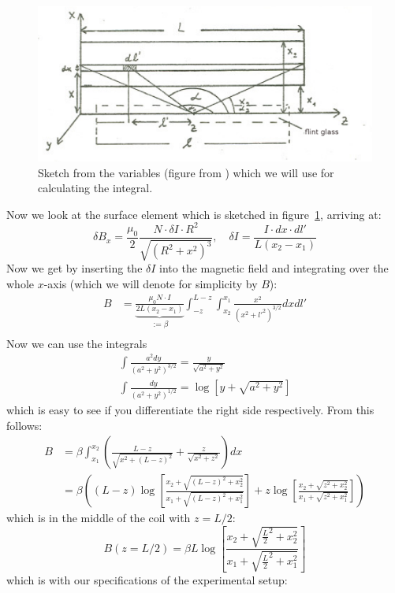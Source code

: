 \begin{figure}
    \begin{centering}
        \includegraphics[width=14cm]{figures/integral}
\caption{Sketch from the variables (figure from \cite{staatsexamen}) which we will use
            for calculating the integral. 
            }
        \label{fig:integral}
    \end{centering}
\end{figure}
Now we look at the surface element which is sketched in figure~\ref{fig:integral},
arriving at:
\begin{equation}
 \delta B_x =  \frac{\mu_0}{2} \frac{N \cdot \delta I  \cdot R^2}{\sqrt{\left (R^2 + x^2 \right )^3}} ,
 \quad \delta I = \frac{ I \cdot dx \cdot dl'}{L(x_2 - x_1)}
\end{equation}
Now we get by inserting the $\delta I$ into the magnetic field and integrating over
the whole $x$-axis (which we will denote for simplicity by $B$):
\begin{align}
    B &= \underbrace{ \frac{\mu_0 N\cdot I}{2 L (x_2 - x_1)} }_{:=\beta}
    \int^{L-z}_{-z} \int^{x_1}_{x_2} \frac{x^2}{(x^2 + l'^2)^{3/2}} dx dl'\\
\end{align}
Now we can use the integrals
\begin{align}
    \int \frac{a^2 dy}{(a^2 + y^2)^{3/2}} =  \frac{y}{\sqrt{a^2 + y^2}} \\
    \int \frac{dy}{(a^2 + y^2)^{1/2}} =  \log{\left [ y + \sqrt{a^2 + y^2} \right]}
\end{align}
which is easy to see if you differentiate the right side respectively. From this follows:
\begin{align}
    B &= \beta \int^{x_2}_{x_1} \left (  \frac{L - z}{\sqrt{x^2 + (L-z)^2}} +
      \frac{z}{\sqrt{x^2 + z^2}}    \right ) dx  \\
  &= \beta  \left (
  (L-z) \log{\left [ \frac{x_2 + \sqrt{(L-z)^2 + x_2^2}} { x_1 + \sqrt{(L-z)^2 + x_1^2}} \right]}
  +z \log{\left [ \frac{x_2 + \sqrt{z^2 + x_2^2}} { x_1 + \sqrt{z^2 + x_1^2}} \right]}
  \right)
\end{align}
which is in the middle of the coil with $z = L/2$:
\begin{equation}
    B(z = L/2) = \beta 
    L \log{\left [ \frac{x_2 + \sqrt{\frac{L}{2}^2+ x_2^2}} { x_1 + \sqrt{\frac{L}{2}^2 + x_1^2}} \right]}
\end{equation}
which is with our specifications of the experimental setup:


